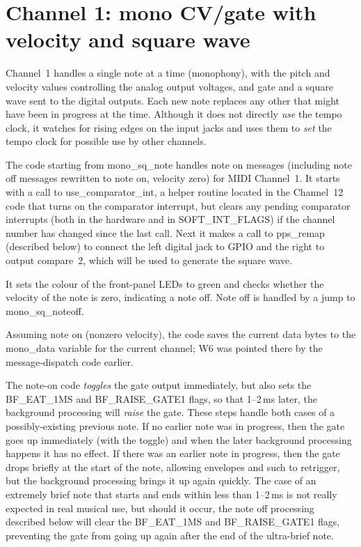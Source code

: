 \section{Channel 1:  mono CV/gate with velocity and square wave}

Channel~1 handles a single note at a time (monophony), with the pitch and
velocity values controlling the analog output voltages, and gate and a
square wave sent to the digital outputs.  Each new note replaces any other
that might have been in progress at the time.  Although it does not directly
\emph{use} the tempo clock, it watches for rising edges on the input jacks
and uses them to \emph{set} the tempo clock for possible use by other
channels.

The code starting from mono\_sq\_note handles note on messages (including
note off messages rewritten to note on, velocity zero) for MIDI Channel~1. 
It starts with a call to use\_comparator\_int, a helper routine located in
the Channel~12 code that turns on the comparator interrupt, but clears any
pending comparator interrupts (both in the hardware and in SOFT\_INT\_FLAGS)
if the channel number has changed since the last call.  Next it makes a call
to pps\_remap (described below) to connect the left digital jack to GPIO and
the right to output compare~2, which will be used to generate the square
wave.

It sets the colour of the front-panel LEDs to green and checks whether
the velocity of the note is zero, indicating a note off.  Note off is
handled by a jump to mono\_sq\_noteoff.

Assuming note on (nonzero velocity), the code saves the current data bytes
to the mono\_data variable for the current channel; W6 was pointed there by
the message-dispatch code earlier.

The note-on code \emph{toggles} the gate output immediately, but also sets
the BF\_EAT\_1MS and BF\_RAISE\_GATE1 flags, so that 1--2\,ms later, the
background processing will \emph{raise} the gate.  These steps handle both
cases of a possibly-existing previous note.  If no earlier note was in
progress, then the gate goes up immediately (with the toggle) and when the
later background processing happens it has no effect.  If there was an
earlier note in progress, then the gate drops briefly at the start of the
note, allowing envelopes and such to retrigger, but the background
processing brings it up again quickly.  The case of an extremely brief note
that starts and ends within less than 1--2\,ms is not really expected in
real musical use, but should it occur, the note off processing described
below will clear the BF\_EAT\_1MS and BF\_RAISE\_GATE1 flags, preventing the
gate from going up again after the end of the ultra-brief note.

